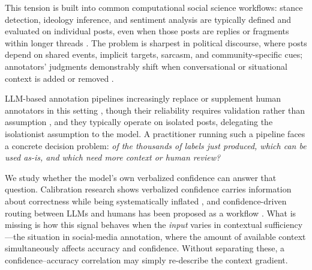 \documentclass[11pt]{article}
\begin{document}
This tension is built into common computational social science workflows: stance detection, ideology inference, and sentiment analysis are typically defined and evaluated on individual posts, even when those posts are replies or fragments within longer threads \cite[e.g., for stance,][]{mohammad_semeval-2016_2016, li_p-stance_2021, allaway_zero-shot_2020}. The problem is sharpest in political discourse, where posts depend on shared events, implicit targets, sarcasm, and community-specific cues; annotators' judgments demonstrably shift when conversational or situational context is added or removed \cite{joseph_constance_2017}.

LLM-based annotation pipelines increasingly replace or supplement human annotators in this setting \cite{gilardi_chatgpt_2023, tornberg_large_2025}, though their reliability requires validation rather than assumption \cite{pangakis_automated_2023, ziems_can_2024}, and they typically operate on isolated posts, delegating the isolationist assumption to the model. A practitioner running such a pipeline faces a concrete decision problem: \emph{of the thousands of labels just produced, which can be used as-is, and which need more context or human review?}

We study whether the model's own verbalized confidence can answer that question. Calibration research shows verbalized confidence carries information about correctness while being systematically inflated \cite{tian_just_2023, xiong_can_2024}, and confidence-driven routing between LLMs and humans has been proposed as a workflow \cite{gligoric_can_2025}. What is missing is how this signal behaves when the \emph{input} varies in contextual sufficiency---the situation in social-media annotation, where the amount of available context simultaneously affects accuracy and confidence. Without separating these, a confidence--accuracy correlation may simply re-describe the context gradient.
\end{document}
